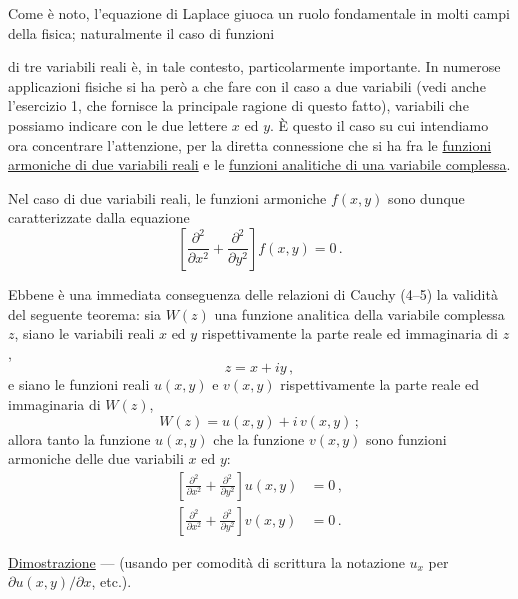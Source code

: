\documentclass[11pt, a4paper]{book}
\numberwithin{equation}{section}
\begin{document}
Come è noto, l'equazione di Laplace giuoca un ruolo fondamentale in molti campi della fisica; naturalmente il caso di funzioni


di tre variabili reali è, in tale contesto, particolarmente importante. In numerose applicazioni fisiche si ha però a che fare con il caso a due variabili (vedi anche l'esercizio 1, che fornisce la principale ragione di questo fatto), variabili che possiamo indicare con le due lettere $x$ ed $y$. È questo il caso su cui intendiamo ora concentrare l'attenzione, per la diretta connessione che si ha fra le \uline{funzioni armoniche di due variabili reali} e le \uline{funzioni analitiche di una variabile complessa}.

Nel caso di due variabili reali, le funzioni armoniche $f(x,y)$ sono dunque caratterizzate dalla equazione
\begin{equation}
\left[\frac{\partial^2}{\partial x^2} + \frac{\partial^2}{\partial y^2}\right]f(x,y) = 0\,. \tag{3}
\end{equation}

Ebbene è una immediata conseguenza delle relazioni di Cauchy (4--5) la validità del seguente teorema: sia $W(z)$ una funzione analitica della variabile complessa $z$, siano le variabili reali $x$ ed $y$ rispettivamente la parte reale ed immaginaria di $z$,
\begin{equation}
z = x + iy\,, \tag{4}
\end{equation}
e siano le funzioni reali $u(x,y)$ e $v(x,y)$ rispettivamente la parte reale ed immaginaria di $W(z)$,
\begin{equation}
W(z) = u(x,y) + i\,v(x,y)\,; \tag{5}
\end{equation}
allora tanto la funzione $u(x,y)$ che la funzione $v(x,y)$ sono funzioni armoniche delle due variabili $x$ ed $y$:
\begin{align}
\left[\frac{\partial^2}{\partial x^2} + \frac{\partial^2}{\partial y^2}\right]u(x,y) &= 0\,, \tag{6a}\\
\left[\frac{\partial^2}{\partial x^2} + \frac{\partial^2}{\partial y^2}\right]v(x,y) &= 0\,. \tag{6b}
\end{align}

\noindent\uline{Dimostrazione} --- (usando per comodità di scrittura la notazione $u_x$ per $\partial u(x,y)/\partial x$, etc.).

\end{document}
